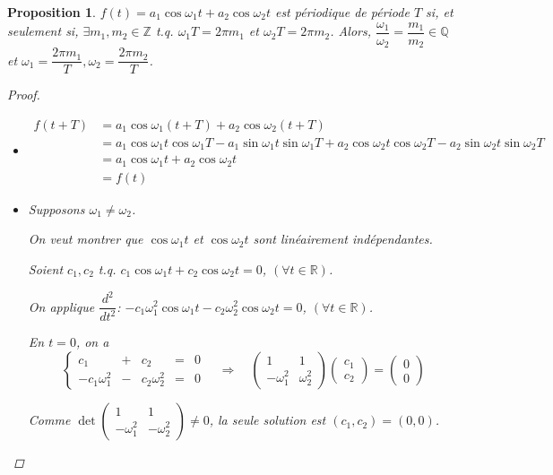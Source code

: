 \documentclass{report}
\newcommand*{\reels}{\mathbb{R}}
\newcommand*{\entiers}{\mathbb{Z}}
\newcommand*{\rationels}{\mathbb{Q}}
\newtheorem*{prop}{Proposition}
\theoremstyle{definition}
\theoremstyle{remark}
\begin{document}
	\begin{prop}
		$f(t) = a_1\cos\omega_1t + a_2\cos\omega_2t$ est p\'eriodique de p\'eriode $T$ si, et seulement si, $\exists m_1,m_2 \in \entiers$ t.q. $\omega_1T = 2\pi m_1$ et $\omega_2T = 2\pi m_2$. Alors, $\dfrac{\omega_1}{\omega_2} = \dfrac{m_1}{m_2} \in \rationels$ et $\omega_1=\dfrac{2\pi m_1}{T}, \omega_2=\dfrac{2\pi m_2}{T}$.
		\begin{proof}~

			\begin{itemize}
				\item[$(\Leftarrow)$]
				\begin{align*}
					f(t+T)&= a_1\cos\omega_1(t+T) + a_2\cos\omega_2(t+T)\\
					&= a_1\cos\omega_1t\cos\omega_1T - a_1\sin\omega_1t\sin\omega_1T + a_2\cos\omega_2t\cos\omega_2T - a_2\sin\omega_2t\sin\omega_2T\\
					&= a_1\cos\omega_1t+a_2\cos\omega_2t\\
					&= f(t)
				\end{align*}
				\item[$(\Rightarrow)$] Supposons $\omega_1 \neq \omega_2$.

				On veut montrer que $\cos\omega_1t$ et $\cos\omega_2t$ sont lin\'eairement ind\'ependantes.

				Soient $c_1, c_2$ t.q. $c_1\cos\omega_1t + c_2\cos\omega_2t = 0$, $(\forall t \in \reels)$.

				On applique $\dfrac{d^2}{dt^2}$: $-c_1\omega_1^2\cos\omega_1t - c_2\omega_2^2\cos\omega_2t = 0$, $(\forall t \in \reels)$.

				En $t=0$, on a
				\[
				\left\{ \begin{array}{rcrcl}
					c_1&+&c_2&=&0\\
					-c_1\omega_1^2&-&c_2\omega_2^2&=&0
				\end{array} \right. \quad\Rightarrow\quad \begin{pmatrix}
					1&1\\
					-\omega_1^2&\omega_2^2
				\end{pmatrix} \begin{pmatrix}
					c_1\\c_2
				\end{pmatrix} = \begin{pmatrix}
					0\\0
				\end{pmatrix}
				\]

				Comme $\det\begin{pmatrix}
					1&1\\
					-\omega_1^2&-\omega_2^2
				\end{pmatrix} \neq 0$, la seule solution est $(c_1,c_2)=(0,0)$.


\end{itemize}
\end{proof}
\end{prop}
\end{document}
